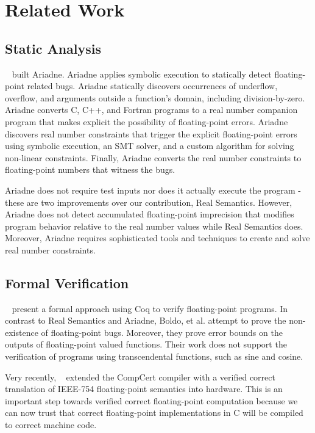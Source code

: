 \section{Related Work}

\subsection{Static Analysis}

\citeauthor{barr}~\cite{barr} built Ariadne. Ariadne applies symbolic execution to statically detect floating-point related bugs. Ariadne statically discovers occurrences of underflow, overflow, and arguments outside a function's domain, including division-by-zero. Ariadne converts C, C++, and Fortran programs to a real number companion program that makes explicit the possibility of floating-point errors. Ariadne discovers real number constraints that trigger the explicit floating-point errors using symbolic execution, an SMT solver, and a custom algorithm for solving non-linear constraints. Finally, Ariadne converts the real number constraints to floating-point numbers that witness the bugs.

Ariadne does not require test inputs nor does it actually execute the program - these are two improvements over our contribution, Real Semantics. However, Ariadne does not detect accumulated floating-point imprecision that modifies program behavior relative to the real number values while Real Semantics does. Moreover, Ariadne requires sophisticated tools and techniques to create and solve real number constraints.

\subsection{Formal Verification}

\citeauthor{boldo}~\cite{boldo} present a formal approach using Coq to verify floating-point programs. In contrast to Real Semantics and Ariadne, Boldo, et al. attempt to prove the non-existence of floating-point bugs. Moreover, they prove error bounds on the outputs of floating-point valued functions. Their work does not support the verification of programs using transcendental functions, such as sine and cosine.

Very recently, \citeauthor{verifiedfp}~\cite{verifiedfp} extended the CompCert compiler with a verified correct translation of IEEE-754 floating-point semantics into hardware. This is an important step towards verified correct floating-point computation because we can now trust that correct floating-point implementations in C will be compiled to correct machine code.


